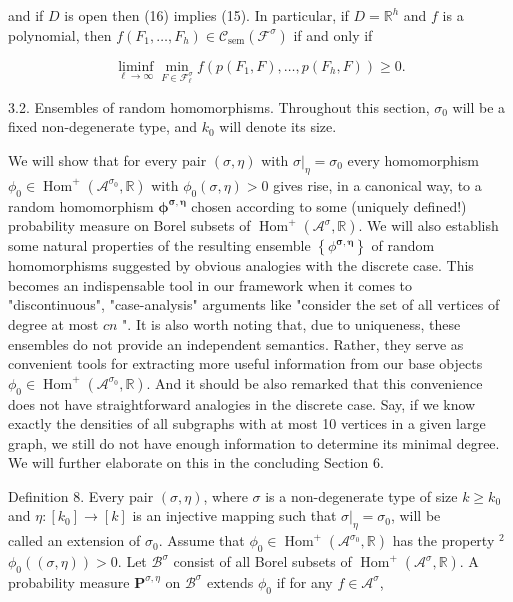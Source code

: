 \documentclass[10pt]{article}
\begin{document}
and if $D$ is open then (16) implies (15). In particular, if $D=\mathbb{R}^{h}$ and $f$ is a polynomial, then $f\left(F_{1}, \ldots, F_{h}\right) \in \mathcal{C}_{\operatorname{sem}}\left(\mathcal{F}^{\sigma}\right)$ if and only if

$$
\liminf _{\ell \rightarrow \infty} \min _{F \in \mathcal{F}_{\ell}^{\sigma}} f\left(p\left(F_{1}, F\right), \ldots, p\left(F_{h}, F\right)\right) \geq 0 .
$$

3.2. Ensembles of random homomorphisms. Throughout this section, $\sigma_{0}$ will be a fixed non-degenerate type, and $k_{0}$ will denote its size.

We will show that for every pair $(\sigma, \eta)$ with $\left.\sigma\right|_{\eta}=\sigma_{0}$ every homomorphism $\phi_{0} \in \operatorname{Hom}^{+}\left(\mathcal{A}^{\sigma_{0}}, \mathbb{R}\right)$ with $\phi_{0}(\sigma, \eta)>0$ gives rise, in a canonical way, to a random homomorphism $\boldsymbol{\phi}^{\boldsymbol{\sigma}, \boldsymbol{\eta}}$ chosen according to some (uniquely defined!) probability measure on Borel subsets of $\operatorname{Hom}^{+}\left(\mathcal{A}^{\sigma}, \mathbb{R}\right)$. We will also establish some natural properties of the resulting ensemble $\left\{\phi^{\boldsymbol{\sigma}, \boldsymbol{\eta}}\right\}$ of random homomorphisms suggested by obvious analogies with the discrete case. This becomes an indispensable tool in our framework when it comes to "discontinuous", "case-analysis" arguments like "consider the set of all vertices of degree at most $c n$ ". It is also worth noting that, due to uniqueness, these ensembles do not provide an independent semantics. Rather, they serve as convenient tools for extracting more useful information from our base objects $\phi_{0} \in \operatorname{Hom}^{+}\left(\mathcal{A}^{\sigma_{0}}, \mathbb{R}\right)$. And it should be also remarked that this convenience does not have straightforward analogies in the discrete case. Say, if we know exactly the densities of all subgraphs with at most 10 vertices in a given large graph, we still do not have enough information to determine its minimal degree. We will further elaborate on this in the concluding Section 6.

Definition 8. Every pair $(\sigma, \eta)$, where $\sigma$ is a non-degenerate type of size $k \geq k_{0}$ and $\eta:\left[k_{0}\right] \longrightarrow[k]$ is an injective mapping such that $\left.\sigma\right|_{\eta}=\sigma_{0}$, will be\\
called an extension of $\sigma_{0}$. Assume that $\phi_{0} \in \operatorname{Hom}^{+}\left(\mathcal{A}^{\sigma_{0}}, \mathbb{R}\right)$ has the property ${ }^{2}$ $\phi_{0}((\sigma, \eta))>0$. Let $\mathcal{B}^{\sigma}$ consist of all Borel subsets of $\operatorname{Hom}^{+}\left(\mathcal{A}^{\sigma}, \mathbb{R}\right)$. A probability measure $\mathbf{P}^{\sigma, \eta}$ on $\mathcal{B}^{\sigma}$ extends $\phi_{0}$ if for any $f \in \mathcal{A}^{\sigma}$,
\end{document}
